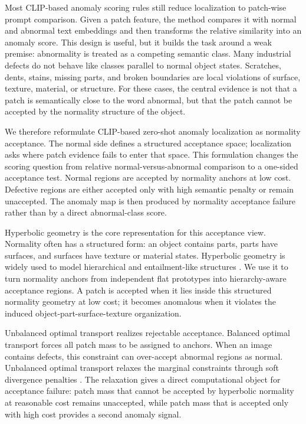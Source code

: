\documentclass[10pt]{article}
\begin{document}
Most CLIP-based anomaly scoring rules still reduce localization to patch-wise prompt comparison.
Given a patch feature, the method compares it with normal and abnormal text embeddings and then transforms the relative similarity into an anomaly score.
This design is useful, but it builds the task around a weak premise: abnormality is treated as a competing semantic class.
Many industrial defects do not behave like classes parallel to normal object states.
Scratches, dents, stains, missing parts, and broken boundaries are local violations of surface, texture, material, or structure.
For these cases, the central evidence is not that a patch is semantically close to the word abnormal, but that the patch cannot be accepted by the normality structure of the object.

We therefore reformulate CLIP-based zero-shot anomaly localization as normality acceptance.
The normal side defines a structured acceptance space; localization asks where patch evidence fails to enter that space.
This formulation changes the scoring question from relative normal-versus-abnormal comparison to a one-sided acceptance test.
Normal regions are accepted by normality anchors at low cost.
Defective regions are either accepted only with high semantic penalty or remain unaccepted.
The anomaly map is then produced by normality acceptance failure rather than by a direct abnormal-class score.

Hyperbolic geometry is the core representation for this acceptance view.
Normality often has a structured form: an object contains parts, parts have surfaces, and surfaces have texture or material states.
Hyperbolic geometry is widely used to model hierarchical and entailment-like structures \cite{nickel2017poincare,ganea2018entailment,desai2023meru}.
We use it to turn normality anchors from independent flat prototypes into hierarchy-aware acceptance regions.
A patch is accepted when it lies inside this structured normality geometry at low cost; it becomes anomalous when it violates the induced object-part-surface-texture organization.

Unbalanced optimal transport realizes rejectable acceptance.
Balanced optimal transport forces all patch mass to be assigned to anchors.
When an image contains defects, this constraint can over-accept abnormal regions as normal.
Unbalanced optimal transport relaxes the marginal constraints through soft divergence penalties \cite{cuturi2013sinkhorn,chizat2018uot}.
The relaxation gives a direct computational object for acceptance failure: patch mass that cannot be accepted by hyperbolic normality at reasonable cost remains unaccepted, while patch mass that is accepted only with high cost provides a second anomaly signal.
\end{document}
